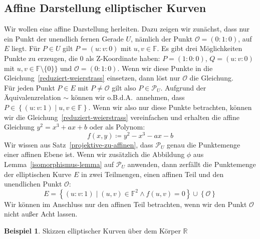 \documentclass[hidelinks]{article}
\theoremstyle{plain}
\theoremstyle{definition}
\newtheorem{bsp}[thm]{Beispiel}
\theoremstyle{rem}
\newcommand{\fnz}{\mathbb{F}\setminus\{0\}}
\newcommand{\pu}{\mathcal{P}_U}
\begin{document}
\begin{sloppypar}
\subsection{Affine Darstellung elliptischer Kurven} \label{affine-darstellung}
Wir wollen eine affine Darstellung herleiten. Dazu zeigen wir zunächst, dass nur ein Punkt der unendlich fernen Gerade $U$, nämlich der Punkt $\mathcal{O} = (0:1:0)$, auf $E$ liegt.
Für $P \in U$ gilt $P = (u:v:0)$ mit $u,v \in \mathbb{F}$. Es gibt drei Möglichkeiten Punkte zu erzeugen, die 0 als Z-Koordinate haben: $P = (1:0:0)$, $Q = (u:v:0)$ mit $u,v \in \fnz\}$ und $\mathcal{O} = (0:1:0)$. 
Wenn wir diese Punkte in die Gleichung~\ref{reduziert-weierstrass} einsetzen, dann löst nur $\mathcal{O}$ die Gleichung. \\ 
Für jeden Punkt $P \in E$ mit $P \neq \mathcal{O}$ gilt also $P \in \pu$. 
Aufgrund der Äquivalenzrelation $\sim$ können wir o.B.d.A.\ annehmen, dass $P \in \left\{(u:v:1) \mid u,v \in \mathbb{F} \right\}$. Wenn wir also nur diese Punkte betrachten, können wir die Gleichung~\ref{reduziert-weierstrass} vereinfachen und erhalten die affine Gleichung $y^2 = x^3 + ax + b$ oder als Polynom: 
\begin{equation} \label{affines-polynom}
    f(x,y) \coloneqq y^2 - x^3 - ax - b
\end{equation}
Wir wissen aus Satz~\ref{projektive-zu-affinen}, dass $\pu$ genau die Punktemenge einer affinen Ebene ist. Wenn wir zusätzlich die Abbildung $\phi$ aus Lemma~\ref{isomorphismus-lemma} auf $\pu$ anwenden, dann zerfällt die Punktemenge der elliptischen Kurve $E$ in zwei Teilmengen, einen affinen Teil und den unendlichen Punkt $\mathcal{O}$:
\begin{equation*}
    E = \left\{(u:v:1) \mid (u,v) \in \mathbb{F}^2 \land f(u,v) = 0 \right\} \cup \left\{ \mathcal{O} \right\}
\end{equation*}
Wir können im Anschluss nur den affinen Teil betrachten, wenn wir den Punkt $\mathcal{O}$ nicht außer Acht lassen.
\begin{bsp}
    Skizzen elliptischer Kurven über dem Körper $\mathbb{R}$
    \begin{figure}[H]
        \centering
\end{figure}
\end{bsp}
\end{sloppypar}
\end{document}
